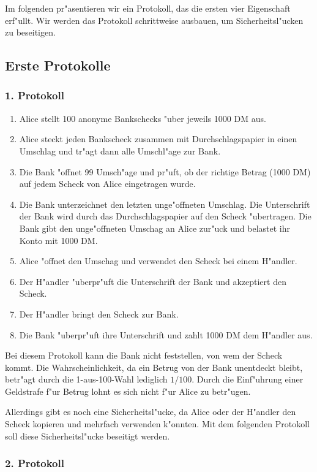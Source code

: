 Im folgenden pr"asentieren wir ein Protokoll, das die ersten vier
Eigenschaft erf"ullt. Wir werden das Protokoll schrittweise ausbauen,
um Sicherheitsl"ucken zu beseitigen.

\subsection{Erste Protokolle}

\subsubsection*{1. Protokoll}
\begin{enumerate} 
  \item Alice stellt 100 anonyme Bankschecks "uber jeweils 1000 DM aus.
  \item Alice steckt jeden Bankscheck zusammen mit Durchschlagspapier
        in einen Umschlag und tr"agt dann alle Umschl"age zur Bank.
  \item Die Bank "offnet 99 Umsch"age und pr"uft, ob der richtige
        Betrag (1000 DM) auf jedem Scheck von Alice eingetragen wurde.
  \item Die Bank unterzeichnet den letzten unge"offneten Umschlag. Die
        Unterschrift der Bank wird durch das Durchschlagspapier auf
        den Scheck "ubertragen.  Die Bank gibt den unge"offneten
        Umschag an Alice zur"uck und belastet ihr Konto mit 1000 DM.
  \item Alice "offnet den Umschag und verwendet den Scheck bei einem
        H"andler.
  \item Der H"andler "uberpr"uft die Unterschrift der Bank und
        akzeptiert den Scheck.
  \item Der H"andler bringt den Scheck zur Bank.
  \item Die Bank "uberpr"uft ihre Unterschrift und zahlt 1000 DM dem
        H"andler aus.
\end{enumerate}
Bei diesem Protokoll kann die Bank nicht feststellen, von wem der
Scheck kommt. Die Wahrscheinlichkeit, da\3 ein Betrug von der Bank
unentdeckt bleibt, betr"agt durch die 1-aus-100-Wahl lediglich
$1/100$. Durch die Einf"uhrung einer Geldstrafe f"ur Betrug lohnt es
sich nicht f"ur Alice zu betr"ugen.

Allerdings gibt es noch eine Sicherheitsl"ucke, da Alice oder der
H"andler den Scheck kopieren und mehrfach verwenden k"onnten. Mit dem
folgenden Protokoll soll diese Sicherheitsl"ucke beseitigt werden.


\subsubsection*{2. Protokoll} 

